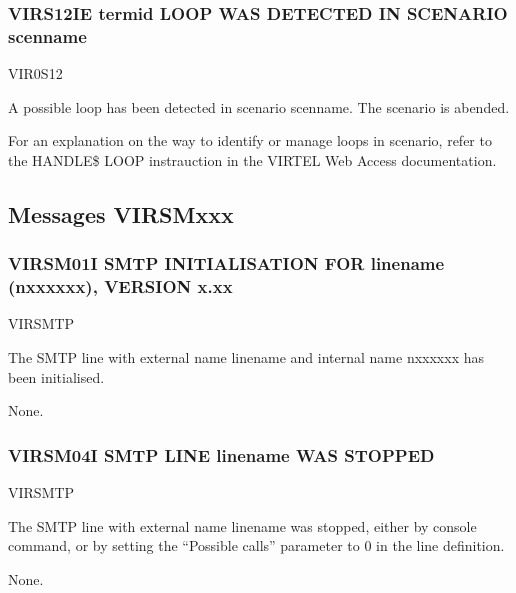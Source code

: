 \documentclass[letterpaper,10pt,english]{sphinxmanual}
\begin{document}
\subsubsection{VIRS12IE termid LOOP WAS DETECTED IN SCENARIO scenname}
\label{\detokenize{messages:virs12ie-termid-loop-was-detected-in-scenario-scenname}}\begin{description}
\sphinxAtStartPar
VIR0S12

\sphinxAtStartPar
A possible loop has been detected in scenario scenname. The scenario is abended.

\sphinxAtStartPar
For an explanation on the way to identify or manage loops in scenario, refer to the HANDLE\$ LOOP instrauction in the VIRTEL Web Access documentation.

\end{description}


\subsection{Messages VIRSMxxx}
\label{\detokenize{messages:messages-virsmxxx}}

\subsubsection{VIRSM01I SMTP INITIALISATION FOR linename (n\sphinxhyphen{}xxxxxx), VERSION x.xx}
\label{\detokenize{messages:virsm01i-smtp-initialisation-for-linename-n-xxxxxx-version-x-xx}}\begin{description}
\sphinxAtStartPar
VIRSMTP

\sphinxAtStartPar
The SMTP line with external name linename and internal name n\sphinxhyphen{}xxxxxx has been initialised.

\sphinxAtStartPar
None.

\end{description}


\subsubsection{VIRSM04I SMTP LINE linename WAS STOPPED}
\label{\detokenize{messages:virsm04i-smtp-line-linename-was-stopped}}\begin{description}
\sphinxAtStartPar
VIRSMTP

\sphinxAtStartPar
The SMTP line with external name linename was stopped, either by console command, or by setting the “Possible calls” parameter to 0 in the line definition.

\sphinxAtStartPar
None.

\end{description}
\end{document}
